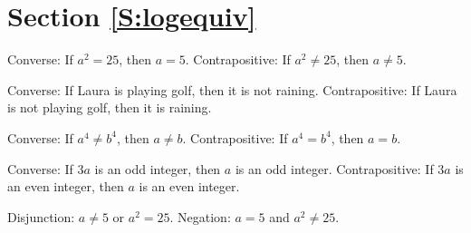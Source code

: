 \section*{Section \ref{S:logequiv}}

\begin{list}{\bf{\ref{exer:sec23-1}.}}
\item \begin{list}{\bf{(a)}}
\item Converse:  If $a^2 = 25$, then $a = 5$.  Contrapositive:  If $a^2 \ne 25$, then $a \ne 5$.
\end{list}
\end{list}

\begin{list}{}
\item \begin{list}{\bf{(b)}}
\item Converse:  If Laura is playing golf, then it is not raining.  Contrapositive:  If Laura is not playing golf, then it is raining.
\end{list}
\end{list}

\begin{list}{}
\item \begin{list}{\bf{(c)}}
\item Converse:  If $a^4 \ne b^4$, then $a \ne b$.   Contrapositive:  If $a^4 = b^4$, then $a = b$.
\end{list}
\end{list}

\begin{list}{}
\item \begin{list}{\bf{(d)}}
\item Converse:  If $3a$ is an odd integer, then $a$ is an odd integer.   Contrapositive:  If $3a$ is an even integer, then $a$ is an even integer.
\end{list}
\end{list}



\begin{list}{\bf{\ref{exer:sec23-2}.}}
\item \begin{list}{\bf{(a)}}
\item Disjunction:  $a \ne 5$ or $a^2 = 25$.  Negation:  $a = 5$ and $a^2 \ne 25$.
\end{list}
\end{list}


